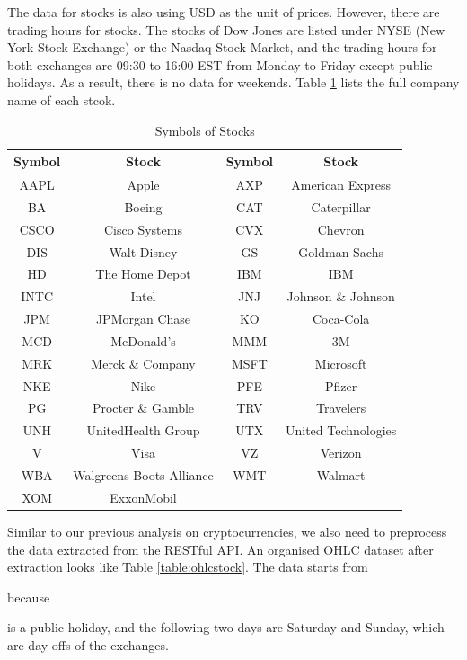 \documentclass[11pt]{article} %
\theoremstyle{plain}
\theoremstyle{definition}
\begin{document}
The data for stocks is also using USD as the unit of prices. However, there are trading hours for stocks. The stocks of Dow Jones are listed under NYSE (New York Stock Exchange) or the Nasdaq Stock Market, and the trading hours for both exchanges are 09:30 to 16:00 EST from Monday to Friday except public holidays. As a result, there is no data for weekends. Table \ref{table:symbolstock} lists the full company name of each stcok.

{
  \begin{table}[ht]
    \centering
    \small
    \begin{tabular}{|c|c|c|c|}
        \hline
        Symbol & Stock & Symbol & Stock \\
        \hline
        AAPL & Apple & AXP & American Express \\
        BA & Boeing & CAT & Caterpillar \\
        CSCO & Cisco Systems & CVX & Chevron \\
        DIS & Walt Disney & GS & Goldman Sachs \\
        HD & The Home Depot & IBM & IBM \\
        INTC & Intel & JNJ & Johnson \& Johnson \\
        JPM & JPMorgan Chase & KO & Coca-Cola \\
        MCD & McDonald's & MMM & 3M \\
        MRK & Merck \& Company & MSFT & Microsoft \\
        NKE & Nike & PFE & Pfizer \\
        PG & Procter \& Gamble & TRV & Travelers \\
        UNH & UnitedHealth Group & UTX & United Technologies \\
        V & Visa & VZ & Verizon \\
        WBA & Walgreens Boots Alliance & WMT & Walmart \\
        XOM & ExxonMobil & & \\
        \hline
    \end{tabular}
    \caption{Symbols of Stocks}
    \label{table:symbolstock}
  \end{table}
}

Similar to our previous analysis on cryptocurrencies, we also need to preprocess the data extracted from the RESTful API. An organised OHLC dataset after extraction looks like Table \ref{table:ohlcstock}. The data starts from \date{4th January 2016} because \date{1st January 2016} is a public holiday, and the following two days are Saturday and Sunday, which are day offs of the exchanges.
\end{document}
